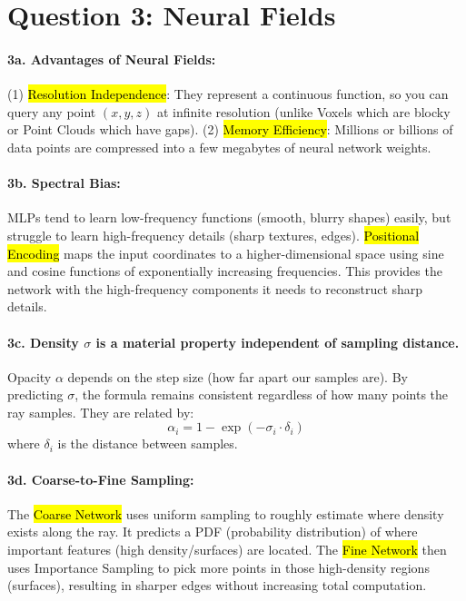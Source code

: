 \documentclass[11pt]{article}
\begin{document}
\section*{Question 3: Neural Fields}

\paragraph{3a. Advantages of Neural Fields:} (1) \hl{Resolution Independence}: They represent a continuous function, so you can query any point $(x,y,z)$ at infinite resolution (unlike Voxels which are blocky or Point Clouds which have gaps). (2) \hl{Memory Efficiency}: Millions or billions of data points are compressed into a few megabytes of neural network weights.

\paragraph{3b. Spectral Bias:} MLPs tend to learn low-frequency functions (smooth, blurry shapes) easily, but struggle to learn high-frequency details (sharp textures, edges). \hl{Positional Encoding} maps the input coordinates to a higher-dimensional space using sine and cosine functions of exponentially increasing frequencies. This provides the network with the high-frequency components it needs to reconstruct sharp details.

\paragraph{3c. Density $\sigma$ is a material property independent of sampling distance.} Opacity $\alpha$ depends on the step size (how far apart our samples are). By predicting $\sigma$, the formula remains consistent regardless of how many points the ray samples. They are related by:
\[
\alpha_i = 1 - \exp(-\sigma_i \cdot \delta_i)
\]
where $\delta_i$ is the distance between samples.

\paragraph{3d. Coarse-to-Fine Sampling:} The \hl{Coarse Network} uses uniform sampling to roughly estimate where density exists along the ray. It predicts a PDF (probability distribution) of where important features (high density/surfaces) are located. The \hl{Fine Network} then uses Importance Sampling to pick more points in those high-density regions (surfaces), resulting in sharper edges without increasing total computation.
\end{document}
